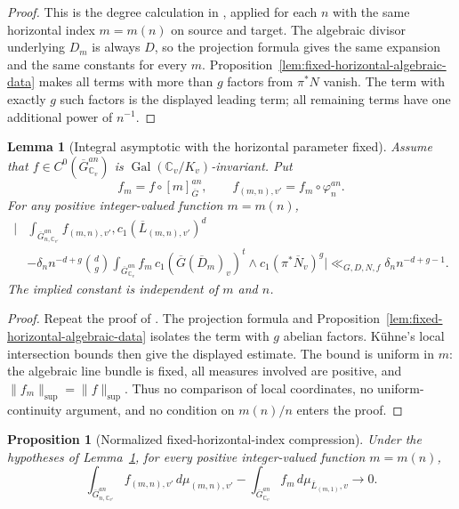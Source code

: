 \documentclass[10pt,a4paper]{amsart}
\theoremstyle{plain}
\newtheorem{lemma}[theorem]{Lemma}
\newtheorem{proposition}[theorem]{Proposition}
\DeclareMathOperator{\Gal}{Gal}
\theoremstyle{plain}
\numberwithin{equation}{section}
\providecommand{\ol}{\overline}
\begin{document}
\begin{proof}
	This is the degree calculation in \cite[Lemmas~4.2 and~4.3]{Ku1}, applied for
	each \(n\) with the same horizontal index \(m=m(n)\) on source and target.
	The algebraic divisor underlying \(D_m\) is always \(D\), so the projection
	formula gives the same expansion and the same constants for every \(m\).
	Proposition~\ref{lem:fixed-horizontal-algebraic-data} makes all terms with more than
	\(g\) factors from \(\pi^*N\) vanish.  The term with exactly \(g\) such
	factors is the displayed leading term; all remaining terms have one additional
	power of \(n^{-1}\).
\end{proof}

\begin{lemma}[Integral asymptotic with the horizontal parameter fixed]
	\label{lem:fixed-m-integral-asymptotic}
	Assume that \(f\in C^0(\overline G_{\mathbb C_v}^{an})\) is
	\(\Gal(\mathbb C_v/K_v)\)-invariant.  Put
	\[
	f_m=f\circ[m]_{\overline G}^{an},\qquad
	f_{(m,n),v'}=f_m\circ\varphi_n^{an}.
	\]
	For any positive integer-valued function \(m=m(n)\),
	\[
	\begin{aligned}
		\biggl|&
		\int_{\overline G_{n,\mathbb C_{v'}}^{an}}
		f_{(m,n),v'},c_1(\ol L_{(m,n),v'})^d\\
		&-\delta_n n^{-d+g}\binom{d}{g}
		\int_{\overline G_{\mathbb C_v}^{an}}
		f_m\,c_1(\overline G(\ol D_m)_v)^t
		\wedge c_1(\pi^*\ol N_v)^g
		\biggr|
		\ll_{G,D,N,f}\delta_n n^{-d+g-1}.
	\end{aligned}
	\]
	The implied constant is independent of \(m\) and \(n\).
\end{lemma}

\begin{proof}
	Repeat the proof of \cite[Lemma~4.3]{Ku1}.  The projection formula and
	Proposition~\ref{lem:fixed-horizontal-algebraic-data} isolates the term with \(g\)
	abelian factors.  K\"uhne's local intersection bounds
	\cite[Lemma~2.2(a),(c)]{Ku1} then give the displayed estimate.  The bound is
	uniform in \(m\): the algebraic line bundle is fixed, all measures involved
	are positive, and \(\|f_m\|_{\sup}=\|f\|_{\sup}\).  Thus no comparison of
	local coordinates, no uniform-continuity argument, and no condition on
	\(m(n)/n\) enters the proof.
\end{proof}

\begin{proposition}[Normalized fixed-horizontal-index compression]
	\label{prop:fixed-m-normalized-compression}
	Under the hypotheses of Lemma~\ref{lem:fixed-m-integral-asymptotic}, for every
	positive integer-valued function \(m=m(n)\),
	\[
	\int_{\overline G_{n,\mathbb C_{v'}}^{an}}
	f_{(m,n),v'}\,d\mu_{(m,n),v'}
	-
	\int_{\overline G_{\mathbb C_v}^{an}}
	f_m\,d\mu_{\ol L_{(m,1)},v}
	\longrightarrow0.
	\]
\end{proposition}
\end{document}
